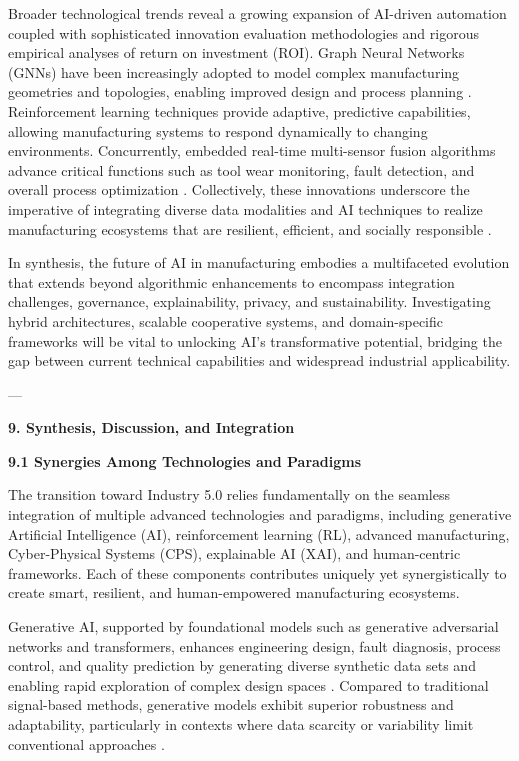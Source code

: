 \documentclass[11pt]{article}
\begin{document}
Broader technological trends reveal a growing expansion of AI-driven automation coupled with sophisticated innovation evaluation methodologies and rigorous empirical analyses of return on investment (ROI). Graph Neural Networks (GNNs) have been increasingly adopted to model complex manufacturing geometries and topologies, enabling improved design and process planning \cite{ref31}. Reinforcement learning techniques provide adaptive, predictive capabilities, allowing manufacturing systems to respond dynamically to changing environments. Concurrently, embedded real-time multi-sensor fusion algorithms advance critical functions such as tool wear monitoring, fault detection, and overall process optimization \cite{ref34,ref39}. Collectively, these innovations underscore the imperative of integrating diverse data modalities and AI techniques to realize manufacturing ecosystems that are resilient, efficient, and socially responsible \cite{ref9,ref33}.

In synthesis, the future of AI in manufacturing embodies a multifaceted evolution that extends beyond algorithmic enhancements to encompass integration challenges, governance, explainability, privacy, and sustainability. Investigating hybrid architectures, scalable cooperative systems, and domain-specific frameworks will be vital to unlocking AI’s transformative potential, bridging the gap between current technical capabilities and widespread industrial applicability.

\newpage  
  


---

\textbf{9. Synthesis, Discussion, and Integration}

\textbf{9.1 Synergies Among Technologies and Paradigms}

The transition toward Industry 5.0 relies fundamentally on the seamless integration of multiple advanced technologies and paradigms, including generative Artificial Intelligence (AI), reinforcement learning (RL), advanced manufacturing, Cyber-Physical Systems (CPS), explainable AI (XAI), and human-centric frameworks. Each of these components contributes uniquely yet synergistically to create smart, resilient, and human-empowered manufacturing ecosystems.

Generative AI, supported by foundational models such as generative adversarial networks and transformers, enhances engineering design, fault diagnosis, process control, and quality prediction by generating diverse synthetic data sets and enabling rapid exploration of complex design spaces \cite{ref1}. Compared to traditional signal-based methods, generative models exhibit superior robustness and adaptability, particularly in contexts where data scarcity or variability limit conventional approaches \cite{ref4}. 
\end{document}
